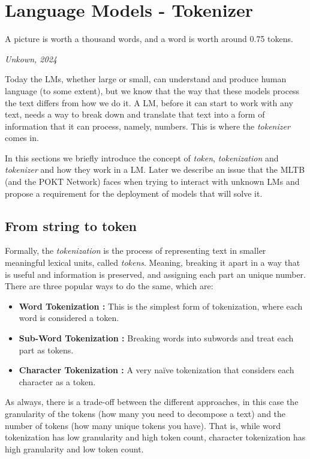\section{Language Models - Tokenizer}\label{sec:b}


\epigraph{A picture is worth a thousand words, and a word is worth around 0.75 tokens.}{\textit{Unkown, 2024}}

Today the \glspl{LM}, whether large or small, can understand and produce human language (to some extent), but we know that the way that these models process the text differs from how we do it. A \gls{LM}, before it can start to work with any text, needs a way to break down and translate that text into a form of information that it can process, namely, numbers. This is where the \emph{tokenizer} comes in.

In this sections we briefly introduce the concept of \textit{token}, \textit{tokenization} and \textit{tokenizer} and how they work in a \gls{LM}. Later we describe an issue that the \gls{MLTB} (and the POKT Network) faces when trying to interact with unknown \glspl{LM} and propose a requirement for the deployment of models that will solve it.

\subsection{From string to token}\label{subsec:b1}

Formally, the \emph{tokenization} is the process of representing text in smaller meaningful lexical units, called \emph{tokens}. Meaning, breaking it apart in a way that is useful and information is preserved, and assigning each part an unique number. There are three popular ways to do the same, which are:
\begin{itemize}
    \item \textbf{Word Tokenization :} This is the simplest form of tokenization, where each word is considered a token. 
    \item \textbf{Sub-Word Tokenization :} Breaking words into subwords and treat each part as tokens.
    \item \textbf{Character Tokenization :} A very naïve tokenization that considers each character as a token. 
\end{itemize}

As always, there is a trade-off between the different approaches, in this case the granularity of the tokens (how many you need to decompose a text) and the number of tokens (how many unique tokens you have). That is, while word tokenization has low granularity and high token count, character tokenization has high granularity and low token count.

